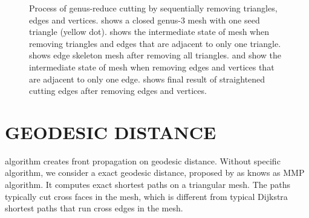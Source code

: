 \documentclass[a4paper,twoside]{article}
\begin{document}
\begin{figure}[h!]
	\hspace{0.00\columnwidth}
	\hspace{0.00\columnwidth}
	\caption[]{Process of genus-reduce cutting by sequentially removing triangles, edges and vertices.  shows a closed genus-3 mesh with one seed triangle (yellow dot).  shows the intermediate state of mesh when removing triangles and edges that are adjacent to only one triangle.  shows edge skeleton mesh after removing all triangles.  and  show the intermediate state of mesh when removing edges and vertices that are adjacent to only one edge.  shows final result of straightened cutting edges after removing edges and vertices.}
	\label{fig:fig-original_genus_reducing_process}
\end{figure}

\section{\uppercase{Geodesic Distance}}
\label{sec:geodesic distance}
\noindent \cite{Gu:2002:GI:566654.566589} algorithm creates front propagation on geodesic distance. Without specific algorithm, we consider a exact geodesic distance, proposed by \cite{Mitchell:1987:DGP:33367.33372} as knows as MMP algorithm. It computes exact shortest paths on a triangular mesh. The paths typically cut cross faces in the mesh, which is different from typical Dijkstra shortest paths \cite{Dijkstra59anote} that run cross edges in the mesh.
\end{document}
